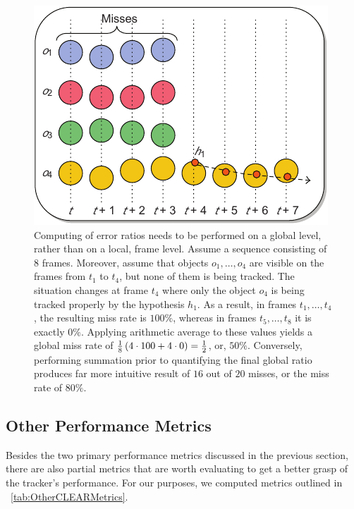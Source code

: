 \begin{figure}[t]
    \centerline{\includegraphics[width=0.6\linewidth]{figures/theoretical_foundations/local_vs_global_ratio_evaluation.pdf}}
    \caption[Local vs. global ratio evaluation]{Computing of error ratios needs to be performed on a global level, rather than on a local, frame level. Assume a sequence consisting of $8$ frames. Moreover, assume that objects $o_1, \dots, o_4$ are visible on the frames from $t_1$ to $t_4$, but none of them is being tracked. The situation changes at frame $t_4$ where only the object $o_4$ is being tracked properly by the hypothesis $h_1$. As a result, in frames $t_1, \dots, t_4$, the resulting miss rate is $100\%$, whereas in frames $t_5, \dots, t_8$ it is exactly $0\%$. Applying arithmetic average to these values yields a global miss rate of $\frac{1}{8} \left( {4 \cdot 100 + 4 \cdot 0} \right) = \frac{1}{2}$, or, $50\%$. Conversely, performing summation prior to quantifying the final global ratio produces far more intuitive result of $16$ out of $20$ misses, or the miss rate of $80\%$. }
    \label{fig:LocalGlobalRatioEval}
\end{figure}


\subsection{Other Performance Metrics}

Besides the two primary performance metrics discussed in the previous section, there are also partial metrics that are worth evaluating to get a better grasp of the tracker's performance. For our purposes, we computed metrics outlined in \tabletext{}~\ref{tab:OtherCLEARMetrics}.

